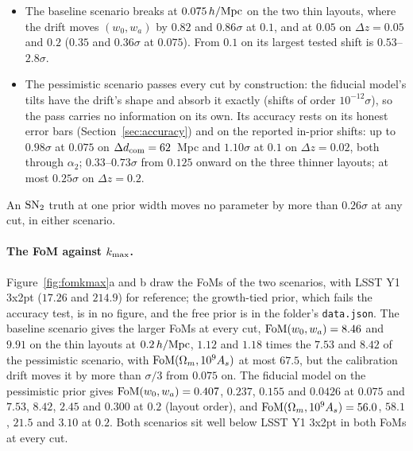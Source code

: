 \documentclass[11pt]{article}
\newcommand{\kmax}{k_{\rm max}}
\newcommand{\hMpc}{\,h/{\rm Mpc}}
\newcommand{\SNt}{{\rm SN}_2}
\begin{document}
\begin{itemize}
  \item The baseline scenario breaks at $0.075\hMpc$ on the two thin
    layouts, where the drift moves $(w_0, w_a)$ by $0.82$ and
    $0.86\sigma$ at $0.1$, and at $0.05$ on $\Delta z = 0.05$ and
    $0.2$ ($0.35$ and $0.36\sigma$ at $0.075$).  From $0.1$ on its
    largest tested shift is $0.53$--$2.8\sigma$.
  \item The pessimistic scenario passes every cut by construction: the
    fiducial model's tilts have the drift's shape and absorb it
    exactly (shifts of order $10^{-12}\sigma$), so the pass carries no
    information on its own.  Its accuracy rests on its honest error
    bars (Section~\ref{sec:accuracy}) and on the reported in-prior
    shifts: up to $0.98\sigma$ at $0.075$ on
    $\Delta d_{\rm com} = 62$~Mpc and $1.10\sigma$ at $0.1$ on
    $\Delta z = 0.02$, both through $\alpha_2$;
    $0.33$--$0.73\sigma$ from $0.125$ onward on the three thinner layouts;
    at most $0.25\sigma$ on $\Delta z = 0.2$.
\end{itemize}
An $\SNt$ truth at one prior width moves no parameter by more than
$0.26\sigma$ at any cut, in either scenario.

\paragraph{The FoM against $\kmax$.}
Figure~\ref{fig:fomkmax}a and b draw the FoMs of the two scenarios,
with LSST Y1 3x2pt ($17.26$ and $214.9$) for reference; the
growth-tied prior, which fails the accuracy test, is in no figure, and
the free prior is in the folder's \texttt{data.json}.  The baseline
scenario gives the larger FoMs at every cut,
${\rm FoM}(w_0, w_a) = 8.46$ and $9.91$ on the thin layouts at
$0.2\hMpc$, $1.12$ and $1.18$ times the $7.53$ and $8.42$ of the
pessimistic scenario, with ${\rm FoM}(\Omega_m, 10^9 A_s)$ at most
$67.5$, but the calibration drift moves it by more than $\sigma/3$
from $0.075$ on.  The fiducial model
on the pessimistic prior gives ${\rm FoM}(w_0, w_a) = 0.407$, $0.237$,
$0.155$ and $0.0426$ at $0.075$ and $7.53$, $8.42$, $2.45$ and $0.300$
at $0.2$ (layout order), and ${\rm FoM}(\Omega_m, 10^9 A_s) = 56.0$,
$58.1$, $21.5$ and $3.10$ at $0.2$.  Both scenarios sit well below
LSST Y1 3x2pt in both FoMs at every cut.

\clearpage

\appendix


\end{document}
